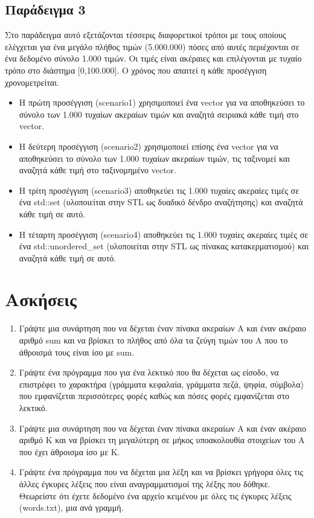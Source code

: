 \subsection{Παράδειγμα 3}
Στο παράδειγμα αυτό εξετάζονται τέσσερις διαφορετικοί τρόποι με τους οποίους ελέγχεται για ένα μεγάλο πλήθος τιμών (5.000.000) πόσες από αυτές περιέχονται σε ένα δεδομένο σύνολο 1.000 τιμών. Οι τιμές είναι ακέραιες και επιλέγονται με τυχαίο τρόπο στο διάστημα [0,100.000]. Ο χρόνος που απαιτεί η κάθε προσέγγιση χρονομετρείται.
\begin{itemize}[noitemsep]
\item Η πρώτη προσέγγιση (scenario1) χρησιμοποιεί ένα vector για να αποθηκεύσει το σύνολο των 1.000 τυχαίων ακεραίων τιμών και αναζητά σειριακά κάθε τιμή στο vector. 
\item Η δεύτερη προσέγγιση (scenario2) χρησιμοποιεί επίσης ένα vector για να αποθηκεύσει το σύνολο των 1.000 τυχαίων ακεραίων τιμών, τις ταξινομεί και αναζητά κάθε τιμή στο ταξινομημένο vector. 
\item Η τρίτη προσέγγιση (scenario3) αποθηκεύει τις 1.000 τυχαίες ακεραίες τιμές σε ένα std::set (υλοποιείται στην STL ως δυαδικό δένδρο αναζήτησης) και αναζητά κάθε τιμή σε αυτό. 
\item Η τέταρτη προσέγγιση (scenario4) αποθηκεύει τις 1.000 τυχαίες ακεραίες τιμές σε ένα std::unordered\_set (υλοποιείται στην STL ως πίνακας κατακερματισμού) και αναζητά κάθε τιμή σε αυτό.
\end{itemize}





\section{Ασκήσεις}
\begin{enumerate}[nolistsep]
\item Γράψτε μια συνάρτηση που να δέχεται έναν πίνακα ακεραίων Α και έναν ακέραιο αριθμό sum και να βρίσκει το πλήθος από όλα τα ζεύγη τιμών του Α που το άθροισμά τους είναι ίσο με sum.
\item Γράψτε ένα πρόγραμμα που για ένα λεκτικό που θα δέχεται ως είσοδο, να επιστρέφει το χαρακτήρα (γράμματα κεφαλαία, γράμματα πεζά, ψηφία, σύμβολα) που εμφανίζεται περισσότερες φορές καθώς και πόσες φορές εμφανίζεται στο λεκτικό.
\item Γράψτε μια συνάρτηση που να δέχεται έναν πίνακα ακεραίων Α και έναν ακέραιο αριθμό Κ και να βρίσκει τη μεγαλύτερη σε μήκος υποακολουθία στοιχείων του Α που έχει άθροισμα ίσο με Κ.
\item Γράψτε ένα πρόγραμμα που να δέχεται μια λέξη και να βρίσκει γρήγορα όλες τις άλλες έγκυρες λέξεις που είναι αναγραμματισμοί της λέξης που δόθηκε. Θεωρείστε ότι έχετε δεδομένο ένα αρχείο κειμένου με όλες τις έγκυρες λέξεις (words.txt), μια ανά γραμμή.
\end{enumerate}

